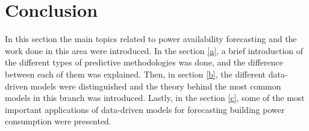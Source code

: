 \section{Conclusion}

In this section the main topics related to power availability forecasting and the work done in this area were introduced. In the section \ref{a}, a brief introduction of the different types of predictive methodologies was done, and the difference between each of them was explained. Then, in section \ref{b}, the different data-driven models were distinguished and the theory behind the most common models in this branch was introduced. Lastly, in the section \ref{c}, some of the most important applications of data-driven models for forecasting building power consumption were presented.
